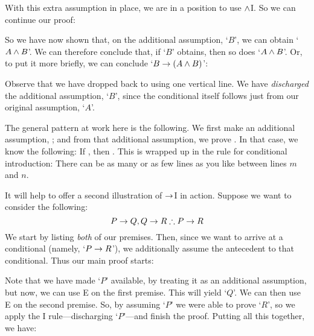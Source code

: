 With this extra assumption in place, we are in a position to use $\mathbin{\wedge}$I. So we can continue our proof:
	\begin{pf}
		\open
	\end{pf}
So we have now shown that, on the additional assumption, `$B$', we can obtain `$A \mathbin{\wedge} B$'. We can therefore conclude that, if `$B$' obtains, then so does `$A \mathbin{\wedge} B$'. Or, to put it more briefly, we can conclude `$B \rightarrow (A \mathbin{\wedge} B)$':
	\begin{pf}
		\hypo{r}{A}
		\open
			\hypo{l}{B}
			\ai{r, l}
			\close
		\ci{l-rl}
	\end{pf}
Observe that we have dropped back to using one vertical line.  We have \emph{discharged} the additional assumption, `$B$', since the conditional itself follows just from our original assumption, `$A$'.

The general pattern at work here is the following. We first make an additional assumption, \metaX; and from that additional assumption, we prove \metaY. In that case, we know the following: If \metaX, then \metaY. This is wrapped up in the rule for conditional introduction:
\factoidbox{
	\begin{pf}
	\open
		\hypo[m]{a}{\metaX}
		\ellipsesline
		\have[n]{b}{\metaY}
	\close
	\have[\ ]{ab}{\metaX\eif\metaY}\ci{a-b}
	\end{pf}}
There can be as many or as few lines as you like between lines $m$ and $n$.

It will help to offer a second  illustration of $\rightarrow$I in action. Suppose we want to consider the following:
	$$P \eif Q, Q \eif R \therefore P \eif R$$
We start by listing \emph{both} of our premises. Then, since we want to arrive at a conditional (namely, `$P \rightarrow R$'), we additionally assume the antecedent to that conditional. Thus our main proof starts:
\begin{pf}
	\hypo{pq}{P \eif Q}
	\hypo{qr}{Q \eif R}
	\open
		\hypo{p}{P}
	\close
\end{pf}
Note that we have made `$P$' available, by treating it as an additional assumption, but now, we can use {\eif}E on the first premise. This will yield `$Q$'. We can then use {\eif}E on the second premise. So, by assuming `$P$' we were able to prove `$R$', so we apply the {\eif}I rule---discharging `$P$'---and finish the proof. Putting all this together, we have:
\label{HSproof}
\begin{pf}
	\open
		\ce{pq,p}
		\ce{qr,q}
	\close
\end{pf}

